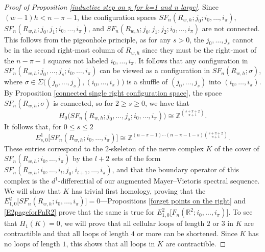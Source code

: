 \documentclass[pagebackref,colorlinks,citecolor=blue,linkcolor=blue,urlcolor=blue,filecolor=blue]{article}
\theoremstyle{definition}\newtheorem{definition}[thm]{Definition}
\theoremstyle{definition}
\newcommand{\Z}{\ensuremath{\mathbb{Z}}}
\newcommand{\R}{\ensuremath{\mathbb{R}}}
\begin{document}
\begin{proof}[Proof of Proposition \ref{inductive step on p for k=1 and n large}]
Since $(w-1)h<n-\pi-1$, the configuration spaces $SF_{n}(R_{w, h};j_{0};i_{0},\dots, i_{\pi})$, $SF_{n}(R_{w, h};j_{0}, j_{1};i_{0},\dots, i_{\pi})$, and $SF_{n}(R_{w, h};j_{0}, j_{1}, j_{2};i_{0},\dots, i_{\pi})$ are not connected.
This follows from the pigeonhole principle, as for any $s>0$, the $j_{0}, \dots, j_{s}$ cannot be in the second right-most column of $R_{w, h}$ since they must be the right-most of the $n-\pi-1$ squares not labeled $i_{0}, \dots, i_{\pi}$.
It follows that any configuration in $SF_{n}(R_{w, h}; j_{0}, \dots, j_{s}; i_{0}, \dots, i_{\pi})$ can be viewed as a configuration in $SF_{n}(R_{w, h}; \sigma)$, where $\sigma\in \Sigma\big((j_{0}, \dots, j_{s}), (i_{0},\dots, i_{\pi})\big)$ is a shuffle of $(j_{0}, \dots, j_{s})$ into $(i_{0},\dots, i_{\pi})$.
By Proposition \ref{connected single right configuration space}, the space $SF_{n}(R_{w, h}; \sigma)$ is connected, so for $2\ge s\ge 0$, we have that 
\[
H_{0}\big(SF_{n}(R_{w, h}; j_{0}, \dots, j_{s}; i_{0}, \dots, i_{\pi} )\big)\cong \Z^{\binom{s+\pi+2}{\pi+1}}.
\]
It follows that, for $0\le s\le 2$
\[
E^{1}_{s,0}\big[SF_{n}(R_{w, h}; i_{0}, \dots, i_{\pi})\big]\cong \Z^{(n-\pi-1)\cdots(n-\pi-1-s)\binom{s+\pi+2}{\pi+1}}.
\]
These entries correspond to the $2$-skeleton of the nerve complex $K$ of the cover of $SF_{n}(R_{w,h};i_{0}, \dots, i_{\pi})$ by the $l+2$ sets of the form $SF_{n}(R_{w,h};i_{0}, \dots, i_{l}, j_{0}, i_{l+1},\dots, i_{\pi})$, and that the boundary operator of this complex is the $d^{1}$-differential of our augmented Mayer--Vietoris spectral sequence.
We will show that $K$ has trivial first homology, proving that the $E^{2}_{1,0}\big[SF_{n}(R_{w, h}; i_{0}, \dots, i_{\pi})\big]=0$---Propositions \ref{forget points on the right} and \ref{E2pageforFnR2} prove that the same is true for $E^{2}_{1,0}\big[F_{n}(\R^{2}; i_{0}, \dots, i_{\pi})\big]$.
To see that $H_{1}(K)=0$, we will prove that all cellular loops of length $2$ or $3$ in $K$ are contractible and that all loops of length $4$ or more can be shortened.
Since $K$ has no loops of length $1$, this shows that all loops in $K$ are contractible.


\end{proof}
\end{document}
